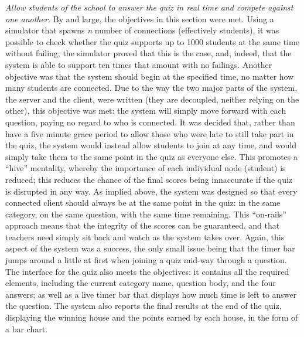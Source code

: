 \textit{Allow students of the school to answer the quiz in real time and compete against one another.} By and large, the objectives in this section were met. Using a simulator that spawns \textit{n} number of connections (effectively students), it was possible to check whether the quiz supports up to 1000 students at the same time without failing; the simulator proved that this is the case, and, indeed, that the system is able to support ten times that amount with no failings. Another objective was that the system should begin at the specified time, no matter how many students are connected. Due to the way the two major parts of the system, the server and the client, were written (they are decoupled, neither relying on the other), this objective was met: the system will simply move forward with each question, paying no regard to who is connected. It was decided that, rather than have a five minute grace period to allow those who were late to still take part in the quiz, the system would instead allow students to join at any time, and would simply take them to the same point in the quiz as everyone else. This promotes a ``hive'' mentality, whereby the importance of each individual node (student) is reduced; this reduces the chance of the final scores being innaccurate if the quiz is disrupted in any way. As implied above, the system was designed so that every connected client should always be at the same point in the quiz: in the same category, on the same question, with the same time remaining. This ``on-rails'' approach means that the integrity of the scores can be guaranteed, and that teachers need simply sit back and watch as the system takes over. Again, this aspect of the system was a success, the only small issue being that the timer bar jumps around a little at first when joining a quiz mid-way through a question. The interface for the quiz also meets the objectives: it contains all the required elements, including the current category name, question body, and the four answers; as well as a live timer bar that displays how much time is left to answer the question. The system also reports the final results at the end of the quiz, displaying the winning house and the points earned by each house, in the form of a bar chart.

